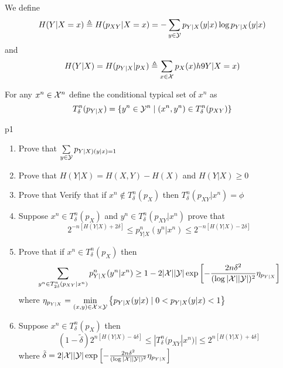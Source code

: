 \documentclass[a4paper, 11pt]{article}
\begin{document}
 We define $$H(Y|X=x)\triangleq H(p_{XY}|X=x)=-\sum_{y\in \mathcal{Y}}p_{Y|X}(y|x)\log p_{Y|X}(y|x)$$ and $$H(Y|X)=H(p_{Y|X}|p_X)\triangleq \sum_{x\in \mathcal{X}}p_X(x)h9Y|X=x)$$
 
 For any $x^n\in \mathcal{X}^n$ define the conditional typical set of $x^n$ as $$T_{\delta}^n(p_{Y|X})=\left\{ y^n\in \mathcal{Y}^n\mid (x^n,y^n)\in T_{\delta}^n(p_{XY}) \right\}$$
\begin{problem}{%
	}{p1%
	}
	\begin{enumerate}
		\item Prove that $\sum\limits_{y\in \mathcal{Y}}p_{Y|X)(y|x)=1}$
		\item Prove that  $H(Y|X)=H(X,Y)-H(X)$ and $H(Y|X)\geq 0$
		\item Prove that Verify that if $x^n\notin T_{\delta}^n(p_X)$ then $T_{\delta}^n(p_{XY}|x^n)=\phi$
		\item Suppose $x^n\in T_{\delta}^n(p_X)$ and $y^n\in T_{\delta}^n(p_{XY}|x^n)$ prove that $$2^{-n[H(Y|X)+2\delta]}\leq p^n_{Y|X}(y^n|x^n)\leq 2^{-n[H(Y|X)-2\delta]}$$
		\item Prove that if $x^n\in T_{\delta}^n(p_{X})$ then $$\sum_{y^n\in T_{2\delta}^n(p_{XY}|x^n)}p_{Y|X}^n(y^n|x^n)\geq 1-2|\mathcal{X}||\mathcal{Y}|\exp\left[ -\frac{2n\delta^2}{(\log |\mathcal{X}||\mathcal{Y}|)^2} \eta_{p_{Y|X}}\right]$$ where $\eta_{p_{Y|X}}=\min\limits_{(x,y)\in \mathcal{X}\times \mathcal{Y}}\left\{ p_{Y|X}(y|x)\mid 0<p_{Y|X}(y|x)<1 \right\}$
		\item Suppose $x^n\in T_{\delta}^n(p_X)$ then $$(1-\tilde{\delta})2^{n[H(Y|X)-4\delta]}\leq |T_{\delta}^n(p_{XY}|x^n)|\leq 2^{n[H(Y|X)+4\delta]}$$ where $\tilde{\delta}=2|\mathcal{X}||\mathcal{Y}|\exp\left[ -\frac{2n\delta^2}{(\log |\mathcal{X}||\mathcal{Y}|)^2} \eta_{p_{Y|X}}\right]$
	\end{enumerate}
\end{problem}


\solve{
}
	
\end{document}
